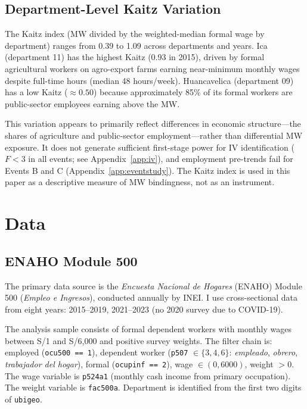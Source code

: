 \documentclass[12pt]{article}
\begin{document}
\subsection{Department-Level Kaitz Variation}

The Kaitz index (MW divided by the weighted-median formal wage by department) ranges from 0.39 to 1.09 across departments and years. Ica (department 11) has the highest Kaitz (0.93 in 2015), driven by formal agricultural workers on agro-export farms earning near-minimum monthly wages despite full-time hours (median 48 hours/week). Huancavelica (department 09) has a low Kaitz ($\approx 0.50$) because approximately 85\% of its formal workers are public-sector employees earning above the MW.

This variation appears to primarily reflect differences in economic structure---the shares of agriculture and public-sector employment---rather than differential MW exposure. It does not generate sufficient first-stage power for IV identification ($F < 3$ in all events; see Appendix~\ref{app:iv}), and employment pre-trends fail for Events B and C (Appendix~\ref{app:eventstudy}). The Kaitz index is used in this paper as a descriptive measure of MW bindingness, not as an instrument.

\section{Data}\label{sec:data}

\subsection{ENAHO Module 500}

The primary data source is the \textit{Encuesta Nacional de Hogares} (ENAHO) Module 500 (\textit{Empleo e Ingresos}), conducted annually by INEI. I use cross-sectional data from eight years: 2015--2019, 2021--2023 (no 2020 survey due to COVID-19).

The analysis sample consists of formal dependent workers with monthly wages between S/1 and S/6,000 and positive survey weights. The filter chain is: employed (\texttt{ocu500 == 1}), dependent worker (\texttt{p507} $\in \{3, 4, 6\}$: \textit{empleado}, \textit{obrero}, \textit{trabajador del hogar}), formal (\texttt{ocupinf == 2}), wage $\in (0, 6000)$, weight $> 0$. The wage variable is \texttt{p524a1} (monthly cash income from primary occupation). The weight variable is \texttt{fac500a}. Department is identified from the first two digits of \texttt{ubigeo}.
\end{document}
